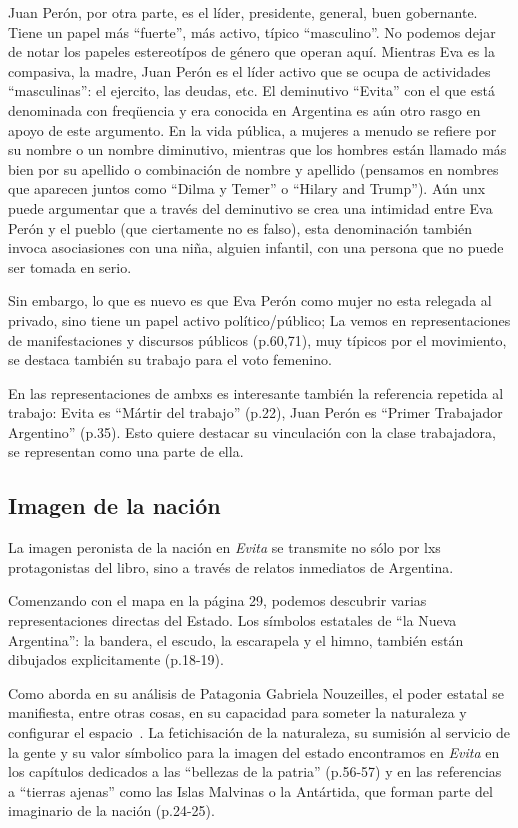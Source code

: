Juan Perón, por otra parte, es el líder, presidente, general, buen gobernante.
Tiene un papel más ``fuerte'', más activo, típico ``masculino''.
No podemos dejar de notar los papeles estereotípos de género que operan aquí.
Mientras Eva es la compasiva, la madre, Juan Perón es el líder activo que se ocupa de actividades ``masculinas'': el ejercito, las deudas, etc.
El deminutivo ``Evita'' con el que está denominada con freqüencia y era conocida en Argentina es aún otro rasgo en apoyo de este argumento.
En la vida pública, a mujeres a menudo se refiere por su nombre o un nombre diminutivo, mientras que los hombres están llamado más bien por su apellido o combinación de nombre y apellido (pensamos en nombres que aparecen juntos como ``Dilma y Temer'' o ``Hilary and Trump'').
Aún unx puede argumentar que a través del deminutivo se crea una intimidad entre Eva Perón y el pueblo (que ciertamente no es falso),
esta denominación también invoca asociasiones con una niña, alguien infantil, con una persona que no puede ser tomada en serio.

Sin embargo, lo que es nuevo es que Eva Perón como mujer no esta relegada al privado, sino tiene un papel activo político/público;
La vemos en representaciones de manifestaciones y discursos públicos (p.60,71), muy típicos por el movimiento, se destaca también su trabajo para el voto femenino.

En las representaciones de ambxs es interesante también la referencia repetida al trabajo:
Evita es ``Mártir del trabajo'' (p.22),
Juan Perón es ``Primer Trabajador Argentino'' (p.35).
Esto quiere destacar su vinculación con la clase trabajadora, se representan como una parte de ella.


\subsection{Imagen de la nación}

La imagen peronista de la nación en \textit{Evita} se transmite no sólo por lxs protagonistas del libro, sino a través de relatos inmediatos de Argentina.

Comenzando con el mapa en la página 29, podemos descubrir varias representaciones directas del Estado.
Los símbolos estatales de ``la Nueva Argentina'': la bandera, el escudo, la escarapela y el himno, también están dibujados explicitamente (p.18-19).

Como aborda en su análisis de Patagonia Gabriela Nouzeilles, el poder estatal se manifiesta, entre otras cosas, en su capacidad para someter la naturaleza y configurar el espacio~\autocite{Nou1999}.
La fetichisación de la naturaleza, su sumisión al servicio de la gente y su valor símbolico para la imagen del estado encontramos en \textit{Evita} en los capítulos dedicados a las ``bellezas de la patria'' (p.56-57) y en las referencias a ``tierras ajenas'' como las Islas Malvinas o la Antártida, que forman parte del imaginario de la nación (p.24-25).

